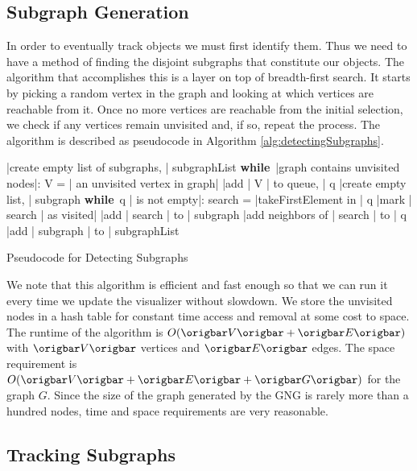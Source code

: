 \documentclass{article}
\renewcommand{\|}{\origbar} %
\renewcommand{\WHILE}{\mbox{{\bf while} }\tab}
\begin{document}
\subsection{Subgraph Generation}

In order to eventually track objects we must first identify them. Thus we need to have a method of finding the disjoint subgraphs that constitute our objects. The algorithm that accomplishes this is a layer on top of breadth-first search. It starts by picking a random vertex in the graph and looking at which vertices are reachable from it. Once no more vertices are reachable from the initial selection, we check if any vertices remain unvisited and, if so, repeat the process. The algorithm is described as pseudocode in Algorithm \ref{alg:detectingSubgraphs}.

\begin{Algorithm}[h!]
\begin{program}
  |create empty list of subgraphs, | subgraphList 
  \WHILE |graph contains unvisited nodes|:
    V = | an unvisited vertex in graph|
    |add | V | to queue, | q
    |create empty list, | subgraph 
    \WHILE q | is not empty|:
      search = |takeFirstElement in | q 
      |mark | search | as visited|
      |add | search | to | subgraph
      |add neighbors of | search | to | q \untab
  |add | subgraph | to | subgraphList
\end{program}
\caption{Pseudocode for Detecting Subgraphs}
\label{alg:detectingSubgraphs}
\end{Algorithm}

We note that this algorithm is efficient and fast enough so that we can run it every time we update the visualizer without slowdown. We store the unvisited nodes in a hash table for constant time access and removal at some cost to space. The runtime of the algorithm is $O(\|V\|+\|E\|)$ with $\|V\|$ vertices and $\|E\|$ edges. The space requirement is $O(\|V\|+\|E\|+\|G\|)$ for the graph $G$. Since the size of the graph generated by the GNG is rarely more than a hundred nodes, time and space requirements are very reasonable.

\subsection{Tracking Subgraphs}
\end{document}
